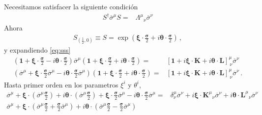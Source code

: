 \begin{frame}
  Necesitamos satisfacer la siguiente condición
\begin{align}
\label{eq:sss}
  S^\dagger\overline{\sigma}^\mu S=&{\Lambda^\mu}_\nu\overline{\sigma}^\nu
\end{align}
Ahora
\begin{align}
\label{eq:SLet}
  S_{\left( \frac{1}{2},0 \right)}\equiv S=
\exp\left( \boldsymbol{\xi}\cdot \frac{\boldsymbol{\sigma}}{2}+i\boldsymbol{\theta}\cdot \frac{\boldsymbol{\sigma}}{2} \right)\,,
\end{align}
y expandiendo \eqref{eq:sss}
\begin{align*}
\left(\boldsymbol{1}+\boldsymbol{\xi}\cdot \frac{\boldsymbol{\sigma}}{2} -i\boldsymbol{\theta}\cdot \frac{\boldsymbol{\sigma}}{2}  \right)
\overline{\sigma}^{\mu}
\left(\boldsymbol{1}+\boldsymbol{\xi}\cdot \frac{\boldsymbol{\sigma}}{2} +i\boldsymbol{\theta}\cdot \frac{\boldsymbol{\sigma}}{2}  \right)
=&\left[ \boldsymbol{1}+i\boldsymbol{\xi}\cdot \boldsymbol{K}+i\boldsymbol{\theta}\cdot \boldsymbol{L} \right]^{\mu}_{\ \nu}\overline{\sigma}^\nu \nonumber\\
\left(\overline{\sigma}^{\mu}+\boldsymbol{\xi}\cdot \frac{\boldsymbol{\sigma}}{2}\overline{\sigma}^{\mu} -i\boldsymbol{\theta}\cdot \frac{\boldsymbol{\sigma}}{2}\overline{\sigma}^{\mu}  \right)
\left(\boldsymbol{1}+\boldsymbol{\xi}\cdot \frac{\boldsymbol{\sigma}}{2} +i\boldsymbol{\theta}\cdot \frac{\boldsymbol{\sigma}}{2}  \right)
=&\left[ \boldsymbol{1}+i\boldsymbol{\xi}\cdot \boldsymbol{K}+i\boldsymbol{\theta}\cdot \boldsymbol{L} \right]^{\mu}_{\ \nu}\overline{\sigma}^\nu \,.
\end{align*}
Hasta primer orden en los parametros $\xi^i$ y $\theta^i$,
\begin{align*}
 \overline{\sigma}^{\mu}+\boldsymbol{\xi}\cdot \left(\overline{\sigma}^{\mu} \frac{\boldsymbol{\sigma}}{2} \right)  +i\boldsymbol{\theta}\cdot \left(\overline{\sigma}^{\mu} \frac{\boldsymbol{\sigma}}{2} \right)+\boldsymbol{\xi}\cdot \frac{\boldsymbol{\sigma}}{2}\overline{\sigma}^{\mu} -i\boldsymbol{\theta}\cdot \frac{\boldsymbol{\sigma}}{2}\overline{\sigma}^{\mu}
 =&\delta^{\mu}_{\nu}\overline{\sigma}^\nu+i\boldsymbol{\xi}\cdot {\boldsymbol{K}^{\mu}}_{\nu}\overline{\sigma}^\nu+i\boldsymbol{\theta}\cdot {\boldsymbol{L}^{\mu}}_{\nu}\overline{\sigma}^\nu \nonumber\\
   \overline{\sigma}^{\mu}+\boldsymbol{\xi}\cdot \left(\overline{\sigma}^{\mu}\frac{\boldsymbol{\sigma}}{2}+ \frac{\boldsymbol{\sigma}}{2}\overline{\sigma}^{\mu}\right)  +i\boldsymbol{\theta}\cdot \left(\overline{\sigma}^{\mu} \frac{\boldsymbol{\sigma}}{2}-\frac{\boldsymbol{\sigma}}{2}\overline{\sigma}^{\mu} \right)  

\end{align*}
\end{frame}
